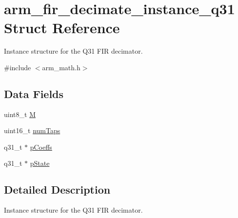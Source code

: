 \hypertarget{structarm__fir__decimate__instance__q31}{\section{arm\-\_\-fir\-\_\-decimate\-\_\-instance\-\_\-q31 Struct Reference}
\label{structarm__fir__decimate__instance__q31}
}


Instance structure for the Q31 F\-I\-R decimator.  




{\ttfamily \#include $<$arm\-\_\-math.\-h$>$}

\subsection*{Data Fields}
\begin{DoxyCompactItemize}
\item 
uint8\-\_\-t \hyperlink{structarm__fir__decimate__instance__q31_ae2c8107d00d3c9942e7a20fc598edecf}{M}
\item 
uint16\-\_\-t \hyperlink{structarm__fir__decimate__instance__q31_a751941891e47f522a7f5375fe8990aac}{num\-Taps}
\item 
q31\-\_\-t $\ast$ \hyperlink{structarm__fir__decimate__instance__q31_a68888e36167d81cb7836db10367a1682}{p\-Coeffs}
\item 
q31\-\_\-t $\ast$ \hyperlink{structarm__fir__decimate__instance__q31_adee4ba3ee8869865af7d8fa08ca913d6}{p\-State}
\end{DoxyCompactItemize}


\subsection{Detailed Description}
Instance structure for the Q31 F\-I\-R decimator. 

